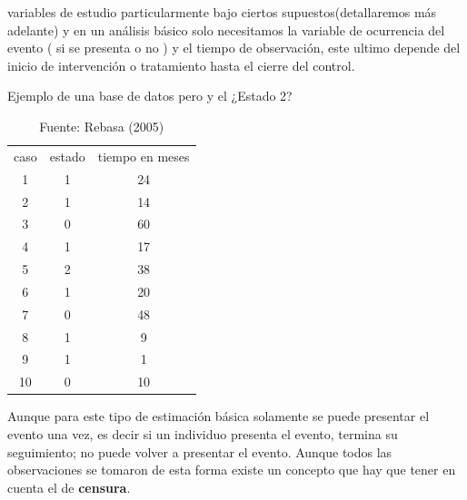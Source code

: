 \documentclass{beamer}
\begin{document}
\begin{frame}{variables de estudio}
particularmente bajo ciertos supuestos(detallaremos más adelante) y en un análisis básico solo necesitamos la variable de ocurrencia del evento ( si se presenta o no ) y  el tiempo de observación, este ultimo depende del inicio de intervención o tratamiento hasta el cierre del control.


\end{frame}








\begin{frame}{Ejemplo de una base de datos pero y el ¿Estado 2?}



\begin{table}[]
\centering
\begin{tabular}{ccc}
caso & estado & tiempo en meses \\
1    & 1      & 24              \\
2    & 1      & 14              \\
3    & 0      & 60              \\
4    & 1      & 17              \\
5    & 2      & 38              \\
6    & 1      & 20              \\
7    & 0      & 48              \\
8    & 1      & 9               \\
9    & 1      & 1               \\
10   & 0      & 10             
\end{tabular}
\caption{Fuente: Rebasa (2005)}
\label{tab:my-table}
\end{table}

\end{frame}


\begin{frame}
Aunque para este tipo de estimación básica solamente se puede presentar el evento una vez,  es decir si un individuo  presenta el evento, termina su seguimiento;  no puede volver a presentar el evento. Aunque todos las observaciones se tomaron de esta forma existe un  concepto  que hay que tener en cuenta el de \textbf{censura}.  


\end{frame}
\end{document}
